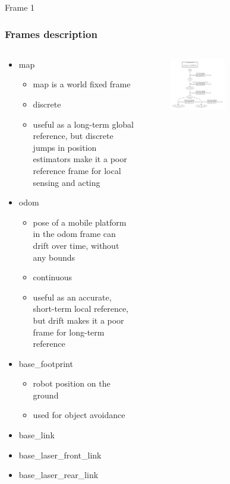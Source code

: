 
\begin{frame}{Frame 1}
\frametitle {Frames description}
 
 \begin{columns}
 \begin{column}{0.5\textwidth}
		\begin{itemize}
		\item map
 			 \begin{itemize}
  				\item map is a world fixed frame
 				 \item  discrete
 				 \item useful as a long-term global reference, but discrete jumps in position estimators make it a poor reference frame for local sensing and acting
  			\end{itemize}
		\item odom
		\begin{itemize}
			\item  pose of a mobile platform in the odom frame can drift over time, without any bounds
			\item continuous 
			\item  useful as an accurate, short-term local reference, but drift makes it a poor frame for long-term reference
		\end{itemize}
	\item base_footprint
		\begin{itemize}
		\item robot position on the ground
		\item used for object avoidance
		\end{itemize}
	\item base_link
	\item base_laser_front_link
	\item base_laser_rear_link
	\end{itemize}
	\end{column} 
 

\begin{column}{0.5\textwidth}  %

    \begin{figure}
     \includegraphics[width=0.5\textwidth]{frames.pdf}
    \end{figure}
\end{column}
\end{columns}

 
\end{frame}